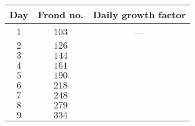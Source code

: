 \begin{tabular}{ccc}                    \toprule
Day & Frond no. & Daily growth factor \\\midrule
$1$ & $103$     & ---                 \\[4pt]
$2$ & $126$ \\[4pt]
$3$ & $144$ \\[4pt]
$4$ & $161$ \\[4pt]
$5$ & $190$ \\[4pt]
$6$ & $218$ \\[4pt]
$7$ & $248$ \\[4pt]
$8$ & $279$ \\[4pt]
$9$ & $334$ \\\bottomrule
\end{tabular}
